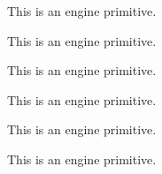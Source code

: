 \begin{function}[]
  {
    \iftrue
  }
  \begin{syntax}
  \end{syntax}
  This is an engine primitive.
\end{function}



\begin{function}[]
  {
    \ifv@
  }
  \begin{syntax}
  \end{syntax}

\end{function}



\begin{function}[]
  {
    \ifvbox
  }
  \begin{syntax}
  \end{syntax}
  This is an engine primitive.
\end{function}



\begin{function}[]
  {
    \ifvmode
  }
  \begin{syntax}
  \end{syntax}
  This is an engine primitive.
\end{function}



\begin{function}[]
  {
    \ifvoid
  }
  \begin{syntax}
  \end{syntax}
  This is an engine primitive.
\end{function}



\begin{function}[]
  {
    \ifx
  }
  \begin{syntax}
  \end{syntax}
  This is an engine primitive.
\end{function}



\begin{function}[]
  {
    \ignorespaces
  }
  \begin{syntax}
  \end{syntax}
  This is an engine primitive.
\end{function}



